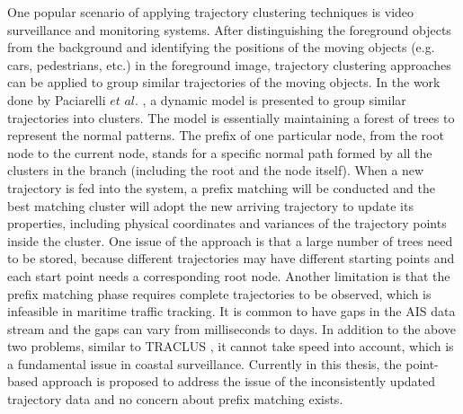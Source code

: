 \documentclass[12pt,glossary]{dalcsthesis}
\begin{document}
One popular scenario of applying trajectory clustering techniques is video surveillance and monitoring systems. After distinguishing the foreground objects from the background  \cite{videosurveillance3} and identifying
the positions of the moving objects (e.g. cars, pedestrians, etc.) in the foreground image, trajectory clustering approaches can be applied to group similar trajectories of the moving objects.  In the work done by Paciarelli $et$ $al$.  \cite{videosurveillance1}\cite{videosurveillance2}, a dynamic model is presented to group similar trajectories into clusters. The model is essentially maintaining a forest of trees to represent the normal patterns. The prefix of one particular node, from the root node to the current node, stands for a specific normal path formed by all the clusters in the branch (including the root and the node itself). When a new trajectory is fed into the system, a prefix matching will be conducted and the best matching cluster will adopt the new arriving trajectory to update its properties, including physical coordinates and variances of the trajectory points inside the cluster. One issue of the approach is that a large number of trees need to be stored, because different trajectories may have different starting points and each start point needs a corresponding root node. Another limitation is that the prefix matching phase requires complete trajectories to be observed, which is infeasible in maritime traffic tracking. It is common to have gaps in the AIS data stream and the gaps can vary from milliseconds to days. In addition to the above two problems, similar to TRACLUS \cite{Lee07}, it cannot take speed into account, which is a fundamental issue in coastal surveillance. Currently in this thesis, the point-based approach is proposed to address the issue of the inconsistently updated trajectory data and no concern about prefix matching exists.
\end{document}
